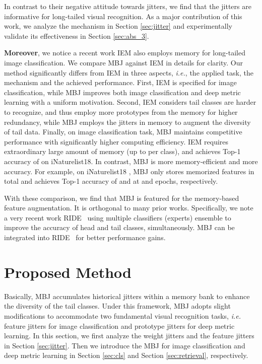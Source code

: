\documentclass[final]{cvpr}
\begin{document}
In contrast to their negative attitude towards jitters, we find that the jitters are informative for long-tailed visual recognition. As a major contribution of this work, we analyze the mechanism in Section \ref{sec:jitter} and experimentally validate its effectiveness in Section \ref{sec:abs_3}. 

\textbf{Moreover}, we notice a recent work IEM \cite{IEM} also employs memory for long-tailed image classification. We compare MBJ against IEM in details for clarity. Our method significantly differs from IEM in three aspects, \emph{i.e.}, the applied task, the mechanism and the achieved performance. First, IEM is specified for image classification, while MBJ improves both image classification and deep metric learning with a uniform motivation. Second, IEM considers tail classes are harder to recognize, and thus employ more prototypes from the memory for higher redundancy, while MBJ employs the jitters in memory to augment the diversity of tail data.
Finally, on image classification task, MBJ maintains competitive performance with significantly higher computing efficiency. IEM requires extraordinary large amount of memory (up to  per class), and achieves Top-1 accuracy of  on iNaturelist18. In contrast, MBJ is more memory-efficient and more accuracy. For example, on iNaturelist18 \cite{inaturalist}, MBJ only stores  memorized features in total and achieves Top-1 accuracy of  and  at  and  epochs, respectively.

With these comparison, we find that MBJ is featured for the memory-based feature augmentation. It is orthogonal to many prior works. Specifically, we note a very recent work RIDE~\cite{wang2020long} using multiple classifiers (experts) ensemble to improve the accuracy of head and tail classes, simultaneously. MBJ can be integrated into RIDE~\cite{wang2020long} for better performance gains.

\section{Proposed Method}\label{sec:methods}
Basically, MBJ accumulates historical jitters within a memory bank to enhance the diversity of the tail classes. Under this framework, MBJ adopts slight modifications to accommodate two fundamental visual recognition tasks, \emph{i.e.} feature jitters for image classification and prototype jitters for deep metric learning. In this section, we first analyze the weight jitters and the feature jitters in Section \ref{sec:jitter}. Then we introduce the MBJ for image classification and deep metric learning in Section \ref{sec:cls} and Section \ref{sec:retrieval}, respectively.
\end{document}
